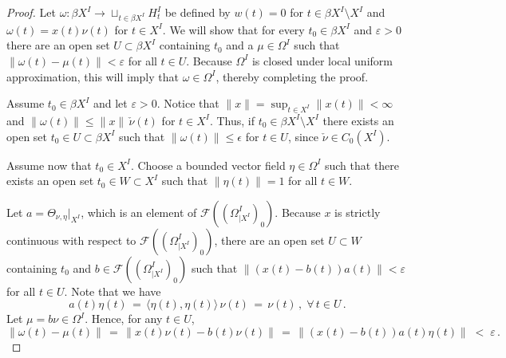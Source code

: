 \documentclass{amsart}
\theoremstyle{definition}
\theoremstyle{remark}
\begin{document}
\begin{proof} Let $\omega:\beta X^I\rightarrow\sqcup_{t\in\beta X^I}H_t^I$ be defined by $w(t)=0$ for $t\in\beta X^I\setminus X^I$
and $\omega(t)=x(t)\nu(t)$ for $t\in X^I$. We will show that for every $t_0\in\beta X^I$ and $\varepsilon>0$ there are an open
set $U\subset\beta X^I$ containing $t_0$ and a $\mu\in\Omega^I$ such that $\|\omega(t)-\mu(t)\|<\varepsilon$ for all $t\in U$.
Because $\Omega^I$ is closed under local uniform approximation, this will imply that $\omega\in\Omega^I$, thereby completing the
proof.

Assume $t_0\in \beta X^I$ and let $\varepsilon>0$. Notice that $\|x\|=\sup_{t\in X^I}\|x(t)\|<\infty$ and  $\|\omega(t)\|\leq \|x\| \,\check{\nu}(t)$ for $t\in X^I$. Thus, if $t_0\in \beta X^I\setminus X^I$ there exists an open set $t_0\in U\subset \beta X^I$ such that $\|\omega(t)\|\leq \epsilon$ for $t\in U$, since $\check{\nu}\in C_0(X^I)$.

Assume now that $t_0\in X^I$.  Choose a bounded vector field $\eta\in\Omega^I$ such that there exists an open set
$t_0\in W\subset X^I$ such that $\|\eta(t)\|=1$ for all $t\in W$.

Let $a=\Theta_{\nu,\eta}|_{X^I}$, which is
an element of $\mathcal F((\Omega^I_{|X^I})_0)$. Because $x$ is strictly continuous with respect to $\mathcal F((\Omega^I_{|X^I})_0)$,
there are an open set $U\subset W$ containing $t_0$ and $b\in\mathcal F((\Omega^I_{|X^I})_0)$ such that
$\|\left(x(t)-b(t)\right)a(t)\|<\varepsilon$ for all $t\in U$. Note that we have
\[
a(t)\eta(t)\,=\,\langle \eta(t),\eta(t)\rangle\,\nu(t)\,=\,\nu(t)\,,\;\forall\,t\in U\,.
\]
Let $\mu=b\nu\in\Omega^I$.
Hence, for any $t\in U$,
\[
\|\omega(t)-\mu(t)\|\,=\,
\|x(t)\nu(t)-b(t)\nu(t)\| \,=\,
\|\left(x(t)-b(t)\right)a(t)\eta(t)\|\;<\;\varepsilon\,.
\]
\end{proof}
\end{document}
